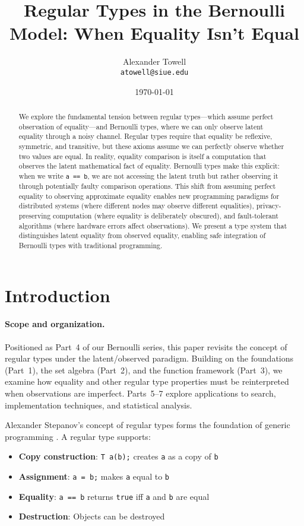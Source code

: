 \documentclass[11pt,final,hidelinks]{article}
\title{Regular Types in the Bernoulli Model: When Equality Isn't Equal}
\author{
    Alexander Towell\\
    \texttt{atowell@siue.edu}
}
\date{\today}
\newcommand{\code}[1]{\texttt{#1}}
\begin{document}
\maketitle

\begin{abstract}
We explore the fundamental tension between regular types—which assume perfect observation of equality—and Bernoulli types, where we can only observe latent equality through a noisy channel. Regular types require that equality be reflexive, symmetric, and transitive, but these axioms assume we can perfectly observe whether two values are equal. In reality, equality comparison is itself a computation that observes the latent mathematical fact of equality. Bernoulli types make this explicit: when we write \code{a == b}, we are not accessing the latent truth but rather observing it through potentially faulty comparison operations. This shift from assuming perfect equality to observing approximate equality enables new programming paradigms for distributed systems (where different nodes may observe different equalities), privacy-preserving computation (where equality is deliberately obscured), and fault-tolerant algorithms (where hardware errors affect observations). We present a type system that distinguishes latent equality from observed equality, enabling safe integration of Bernoulli types with traditional programming.
\end{abstract}

\section{Introduction}

\paragraph{Scope and organization.}  Positioned as Part~4 of our Bernoulli series, this paper revisits the concept of regular types under the latent/observed paradigm.  Building on the foundations (Part~1), the set algebra (Part~2), and the function framework (Part~3), we examine how equality and other regular type properties must be reinterpreted when observations are imperfect.  Parts~5--7 explore applications to search, implementation techniques, and statistical analysis.

Alexander Stepanov's concept of regular types forms the foundation of generic programming \cite{stepanov2014}. A regular type supports:
\begin{itemize}
    \item \textbf{Copy construction}: \code{T a(b);} creates \code{a} as a copy of \code{b}
    \item \textbf{Assignment}: \code{a = b;} makes \code{a} equal to \code{b}
    \item \textbf{Equality}: \code{a == b} returns \code{true} iff \code{a} and \code{b} are equal
    \item \textbf{Destruction}: Objects can be destroyed
\end{itemize}
\end{document}
